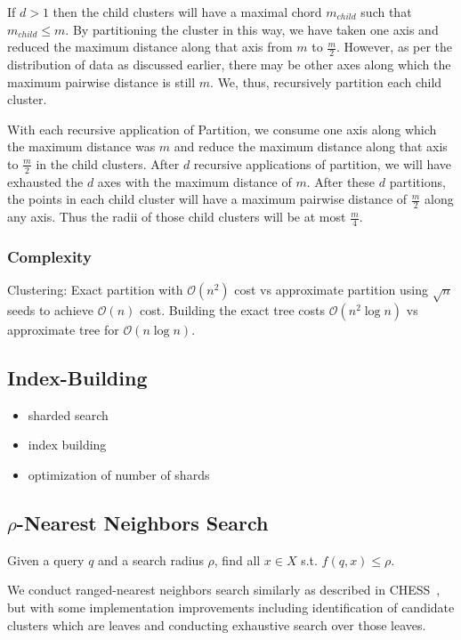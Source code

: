 If $d > 1$ then the child clusters will have a maximal chord $m_{child}$ such that $m_{child} \leq m$.
By partitioning the cluster in this way, we have taken one axis and reduced the maximum distance along that axis from $m$ to $\frac{m}{2}$.
However, as per the distribution of data as discussed earlier, there may be other axes along which the maximum pairwise distance is still $m$.
We, thus, recursively partition each child cluster.

With each recursive application of Partition, we consume one axis along which the maximum distance was $m$ and reduce the maximum distance along that axis to $\frac{m}{2}$ in the child clusters.
After $d$ recursive applications of partition, we will have exhausted the $d$ axes with the maximum distance of $m$.
After these $d$ partitions, the points in each child cluster will have a maximum pairwise distance of $\frac{m}{2}$ along any axis.
Thus the radii of those child clusters will be at most $\frac{m}{4}$.

\subsubsection {Complexity}
\label{subsubsec:methods:clustering:complexity}

Clustering: Exact partition with $\mathcal{O}(n^2)$ cost vs approximate partition using $\sqrt{n}$ seeds to achieve $\mathcal{O}(n)$ cost.
Building the exact tree costs $\mathcal{O}(n^2 \log n)$ vs approximate tree for $\mathcal{O}(n \log n)$.


\subsection {Index-Building}
\begin{itemize}
    \item sharded search 
    \item index building 
    \item optimization of number of shards 
\end{itemize}

\subsection{\texorpdfstring{$\rho$}{p}-Nearest Neighbors Search}
\label{subsec:methods:rnn-search}

Given a query $q$ and a search radius $\rho$, find all $x \in X$ s.t. $f(q, x) \leq \rho$.

We conduct ranged-nearest neighbors search similarly as described in CHESS~\cite{ishaq2019clustered}, but 
with some implementation improvements including identification of candidate clusters which are leaves and 
conducting exhaustive search over those leaves.


